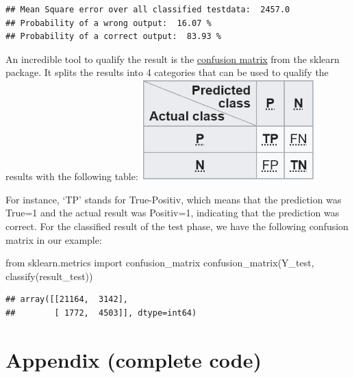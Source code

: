 \documentclass[
]{book}
\newenvironment{Shaded}{\begin{snugshade}}{\end{snugshade}}
\newcommand{\ImportTok}[1]{#1}
\newcommand{\NormalTok}[1]{#1}
\begin{document}
\begin{verbatim}
## Mean Square error over all classified testdata:  2457.0
## Probability of a wrong output:  16.07 %
## Probability of a correct output:  83.93 %
\end{verbatim}

An incredible tool to qualify the result is the \href{https://en.wikipedia.org/wiki/Confusion_matrix}{confusion matrix} from the sklearn package. It splits the results into 4 categories that can be used to qualify the results with the following table:
\includegraphics[width=0.5\textwidth,height=\textheight]{./img/confusion_matrix.png}

For instance, `TP' stands for True-Positiv, which means that the prediction was True=1 and the actual result was Positiv=1, indicating that the prediction was correct. For the classified result of the test phase, we have the following confusion matrix in our example:

\begin{Shaded}
\begin{Highlighting}[]
\ImportTok{from}\NormalTok{ sklearn.metrics }\ImportTok{import}\NormalTok{ confusion\_matrix}
\NormalTok{confusion\_matrix(Y\_test, classify(result\_test))}
\end{Highlighting}
\end{Shaded}

\begin{verbatim}
## array([[21164,  3142],
##        [ 1772,  4503]], dtype=int64)
\end{verbatim}

\hypertarget{appendix-complete-code-3}{%
\section{Appendix (complete code)}\label{appendix-complete-code-3}}
\end{document}
